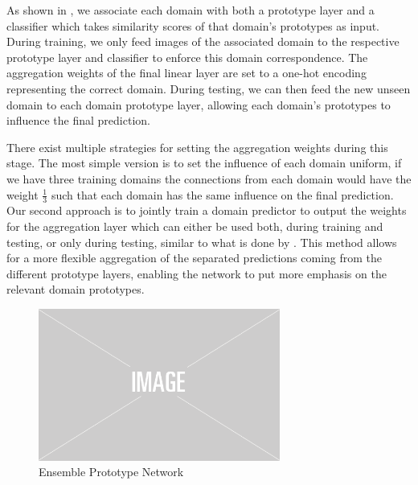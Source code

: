 As shown in , we associate each domain with both a prototype layer and a classifier which takes similarity scores of that domain's prototypes as input. During training, we only feed images of the associated domain to the respective prototype layer and classifier to enforce this domain correspondence. The aggregation weights of the final linear layer are set to a one-hot encoding representing the correct domain. During testing, we can then feed the new unseen domain to each domain prototype layer, allowing each domain's prototypes to influence the final prediction. 

There exist multiple strategies for setting the aggregation weights during this stage. The most simple version is to set the influence of each domain uniform, \ie if we have three training domains the connections from each domain would have the weight $\frac{1}{3}$ such that each domain has the same influence on the final prediction. Our second approach is to jointly train a domain predictor to output the weights for the aggregation layer which can either be used both, during training and testing, or only during testing, similar to what is done by \citet{ManciniBC018}. This method allows for a more flexible aggregation of the separated predictions coming from the different prototype layers, enabling the network to put more emphasis on the relevant domain prototypes.  

\begin{figure}[t]
    \centering
    \includegraphics[width=\textwidth, height=5cm]{Figures/img-placeholder.png}
    \caption{Ensemble Prototype Network}
    \label{fig:ensemble_prototype_network}
\end{figure}

